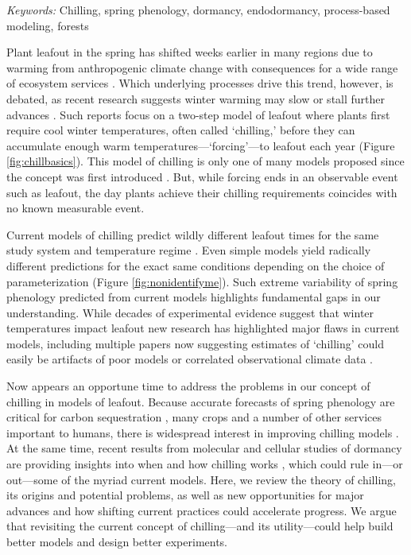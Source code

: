 \documentclass[11pt]{article}
\begin{document}
\emph{Keywords:} Chilling, spring phenology, dormancy, endodormancy, process-based modeling, forests

\newpage
Plant leafout in the spring has shifted weeks earlier in many regions due to warming from anthropogenic climate change with consequences for a wide range of ecosystem services \citep{keenan2014net,ipcc2022}. Which underlying processes drive this trend, however, is debated, as recent research suggests winter warming may slow or stall further advances \citep{fu2015,piao2017}. Such reports focus on a two-step model of leafout where plants first require cool winter temperatures, often called `chilling,' before they can accumulate enough warm temperatures---`forcing'---to leafout each year (Figure \ref{fig:chillbasics}). This model of chilling is only one of many models proposed since the concept was first introduced \citep[][]{basler2016evaluating,hufkens2018integrated}. But, while forcing ends in an observable event such as leafout, the day plants achieve their chilling requirements coincides with no known measurable event. 

Current models of chilling predict wildly different leafout times for the same study system and temperature regime \citep{guy2014,chuine2016}. 
Even simple models yield radically different predictions for the exact same conditions depending on the choice of parameterization (Figure \ref{fig:nonidentifyme}). Such extreme variability of spring phenology predicted from current models highlights fundamental gaps in our understanding. While decades of experimental evidence suggest that winter temperatures impact leafout \citep{charrier2015,baum2021} new research has highlighted major flaws in current models, including multiple papers now suggesting estimates of `chilling' could easily be artifacts of poor models or correlated observational climate data \citep{decsens,gao2024}. 

Now appears an opportune time to address the problems in our concept of chilling in models of leafout. Because accurate forecasts of spring phenology are critical for carbon sequestration \citep{green2022limits,keenan2014net}, many crops and a number of other services important to humans, there is widespread interest in improving chilling models \citep{Luedeling2015Acta,chuine2016}. At the same time, recent results from molecular and cellular studies of dormancy are providing insights into when and how chilling works \citep{pan2023epigenetic,zhu2021cold}, which could rule in---or out---some of the myriad current models. 
Here, we review the theory of chilling, its origins and potential problems, as well as new opportunities for major advances and how shifting current practices could accelerate progress. We argue that revisiting the current concept of chilling---and its utility---could help build better models and design better experiments. 
\end{document}
